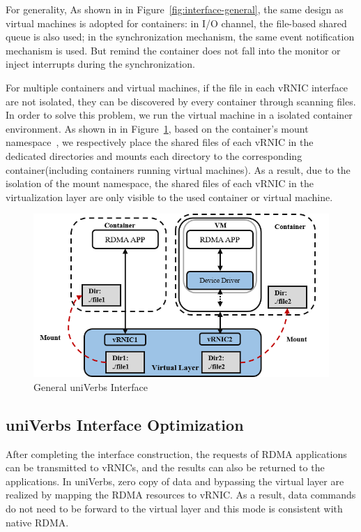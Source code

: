 For generality, As shown in in Figure~\ref{fig:interface-general}, the same design as virtual machines is adopted for containers: in I/O channel, the file-based shared queue is also used; in the synchronization mechanism, the same event notification mechanism is used. But remind the container does not fall into the monitor or inject interrupts during the synchronization.

For multiple containers and virtual machines, if the file in each vRNIC interface are not isolated, they can be discovered by every container through scanning files. In order to solve this problem, we run the virtual machine in a isolated container environment. As shown in in Figure~\ref{fig:interface-isolate}, based on the container's mount namespace~\cite{mount-ns}, we respectively place the shared files of each vRNIC in the dedicated directories and mounts each directory to the corresponding container(including containers running virtual machines). As a result, due to the isolation of the mount namespace, the shared files of each vRNIC in the virtualization layer are only visible to the used container or virtual machine.  

\begin{figure}[!ht]
	\centering
	\includegraphics[width=1.0\linewidth]{images/interface-isolate}
	\caption{General uniVerbs Interface}
	\label{fig:interface-isolate}
\end{figure}

\subsection{uniVerbs Interface Optimization}
After completing the interface construction, the requests of RDMA applications can be transmitted to vRNICs, and the results can also be returned to the applications. In uniVerbs, zero copy of data and bypassing the virtual layer are realized by mapping the RDMA resources to vRNIC. As a result, data commands do not need to be forward to the virtual layer and this mode is consistent with native RDMA.

